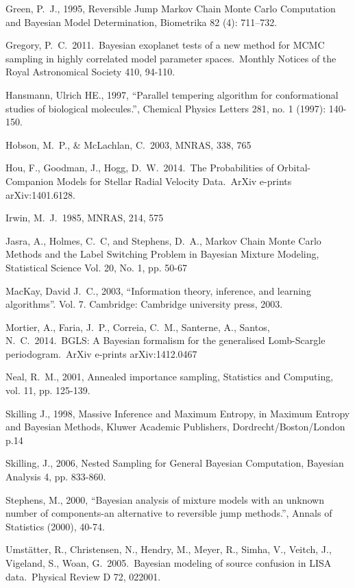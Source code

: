\documentclass[letterpaper, 11pt]{article}
\begin{document}
\begin{thebibliography}{}
Green, P.~J., 1995, Reversible Jump Markov Chain Monte Carlo Computation and Bayesian Model Determination, Biometrika 82 (4): 711–732.

 Gregory, P.~C.\ 2011.\ 
Bayesian exoplanet tests of a new method for MCMC sampling in highly 
correlated model parameter spaces.\ Monthly Notices of the Royal 
Astronomical Society 410, 94-110.

 Hansmann, Ulrich HE., 1997, ``Parallel tempering algorithm for conformational studies of biological molecules.'', Chemical Physics Letters 281, no. 1 (1997): 140-150.

 Hobson, M.~P., \& McLachlan, C.\ 2003, MNRAS, 338, 765 

 Hou, F., Goodman, J., Hogg, 
D.~W.\ 2014.\ The Probabilities of Orbital-Companion Models for Stellar 
Radial Velocity Data.\ ArXiv e-prints arXiv:1401.6128.

 Irwin, M.~J.\ 1985, MNRAS, 214,
575

 Jasra, A., Holmes, C.~C, and
Stephens, D.~A., Markov Chain Monte Carlo Methods and the Label Switching
Problem in Bayesian Mixture Modeling, Statistical Science
Vol. 20, No. 1, pp. 50-67

 MacKay, David J.~C., 2003, ``Information theory, inference, and learning algorithms''. Vol. 7.
Cambridge: Cambridge university press, 2003.

 Mortier, A., Faria, 
J.~P., Correia, C.~M., Santerne, A., Santos, N.~C.\ 2014.\ BGLS: A Bayesian 
formalism for the generalised Lomb-Scargle periodogram.\ ArXiv e-prints 
arXiv:1412.0467

 Neal, R.~M., 2001, 
Annealed importance sampling, Statistics and Computing, vol. 11, pp. 125-139.

Skilling J., 1998, Massive Inference and Maximum Entropy, in Maximum Entropy
and Bayesian Methods, Kluwer Academic Publishers, Dordrecht/Boston/London p.14

 Skilling, J., 2006, Nested Sampling for General Bayesian Computation, Bayesian Analysis 4, pp. 833-860.

 Stephens, M., 2000, ``Bayesian analysis of mixture models with an unknown number of components-an alternative to reversible jump methods.'', Annals of Statistics (2000), 40-74.

 Umst{\"a}tter, 
R., Christensen, N., Hendry, M., Meyer, R., Simha, V., Veitch, J., 
Vigeland, S., Woan, G.\ 2005.\ Bayesian modeling of source confusion in 
LISA data.\ Physical Review D 72, 022001. 

\end{thebibliography}
\end{document}
